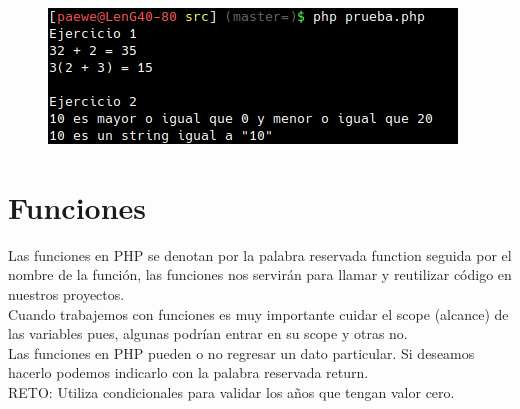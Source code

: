 \documentclass{article}
\begin{document}
\begin{figure}[h!]
  \centering
  \includegraphics[scale=0.75]{./Pictures/035_operadores_exer.png}
\end{figure}


\section{Funciones}%
Las funciones en PHP se denotan por la palabra reservada function seguida por
el nombre de la función, las funciones nos servirán para llamar y reutilizar
código en nuestros proyectos.\\

Cuando trabajemos con funciones es muy importante cuidar el scope (alcance) de
las variables pues, algunas podrían entrar en su scope y otras no.\\

Las funciones en PHP pueden o no regresar un dato particular. Si deseamos
hacerlo podemos indicarlo con la palabra reservada return.\\

RETO: Utiliza condicionales para validar los años que tengan valor cero.\\
\end{document}
